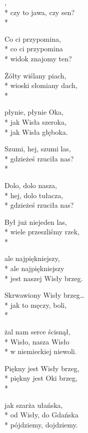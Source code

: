 \begin{lyrics}[longestline={jest naszej Wisły brzeg.}]

,\\*
czy to jawa, czy sen?\\*
\begin{markverses}%
Co ci przypomina,\\*
co ci przypomina\\*
widok znajomy ten?
\end{markverses}

Żółty wiślany piach,\\*
wioski słomiany dach,\\*
\begin{markverses}%
płynie, płynie Oka,\\*
jak Wisła szeroka,\\*
jak Wisła głęboka.
\end{markverses}

Szumi, hej, szumi las,\\*
gdzieżeś rzuciła nas?\\*
\begin{markverses}%
Dolo, dolo nasza,\\*
hej, dolo tułacza,\\*
gdzieżeś rzuciła nas?
\end{markverses}

Był już niejeden las,\\*
wiele przeszliśmy rzek,\\*
\begin{markverses}%
ale najpiękniejszy,\\*
ale najpiękniejszy\\*
jest naszej Wisły brzeg.
\end{markverses}

Skrwawiony Wisły brzeg…\\*
jak to męczy, boli,\\*
\begin{markverses}%
żal nam serce ścisnął,\\*
Wisło, nasza Wisło\\*
w niemieckiej niewoli.
\end{markverses}

Piękny jest Wisły brzeg,\\*
piękny jest Oki brzeg,\\*
\begin{markverses}%
jak szarża ułańska,\\*
od Wisły, do Gdańska\\*
pójdziemy, dojdziemy.
\end{markverses}
\end{lyrics}



